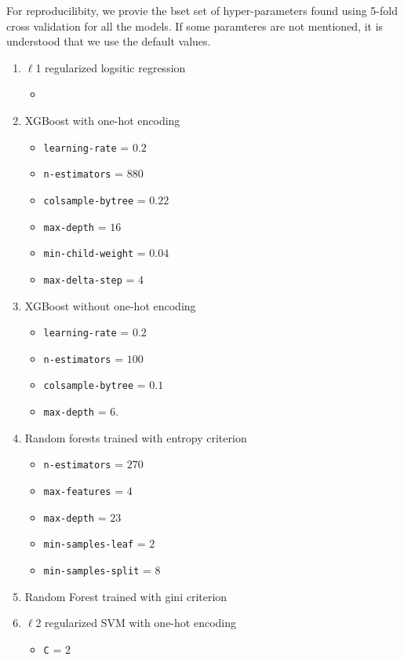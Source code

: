 \documentclass{article}
\begin{document}
For reproducilibity, we provie the bset set of hyper-parameters found using 5-fold cross validation for all the models. If some paramteres are not mentioned, it is understood that we use the default values. 

\begin{enumerate}
	\item $\ell$1 regularized logsitic regression
		\begin{itemize} \itemsep0em
			\item 		
		\end{itemize}
	\item XGBoost with one-hot encoding
		\begin{itemize} \itemsep0em
			\item \texttt{learning-rate} = $0.2$
			\item \texttt{n-estimators} = $880$
			\item \texttt{colsample-bytree} = $0.22$
			\item \texttt{max-depth} = $16$
			\item \texttt{min-child-weight} = $0.04$
			\item \texttt{max-delta-step} = $4$			
		\end{itemize}
	\item XGBoost without one-hot encoding
		\begin{itemize} \itemsep0em
			\item \texttt{learning-rate} = $0.2$
			\item \texttt{n-estimators} = $100$
			\item \texttt{colsample-bytree} = $0.1$
			\item \texttt{max-depth} = $6$.
		\end{itemize}
	\item Random forests trained with entropy criterion
		\begin{itemize}
			\item \texttt{n-estimators} = $270$
			\item \texttt{max-features} = $4$
			\item \texttt{max-depth} = $23$
			\item \texttt{min-samples-leaf} = $2$
			\item \texttt{min-samples-split} = $8$
		\end{itemize}
	\item Random Forest trained with gini criterion
	\item $\ell$2 regularized SVM with one-hot encoding
		\begin{itemize}
			\item \texttt{C} = $2$		
		\end{itemize}
\end{enumerate}
\end{document}
